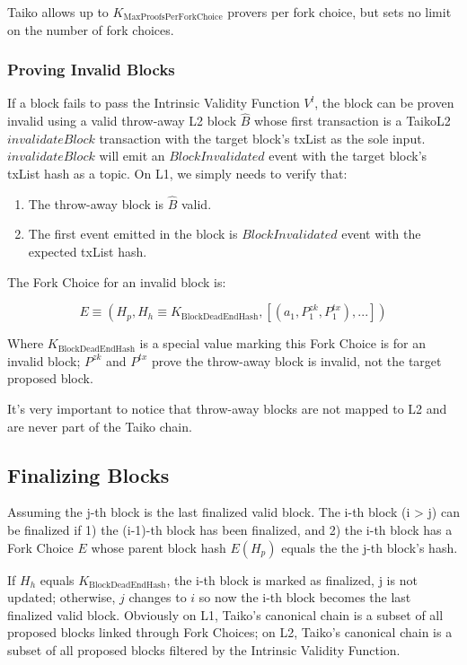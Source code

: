 \documentclass[9pt,oneside]{amsart}
\begin{document}
\begin{multicols}{2}
Taiko allows up to $K_{\mathrm{MaxProofsPerForkChoice}}$ provers per fork choice, but sets no limit on the number of fork choices.

\subsubsection{Proving Invalid Blocks} \label{sec:provinginvaid}

If a block fails to pass the Intrinsic Validity Function $V^l$, the block can be proven invalid using a valid throw-away L2 block $\hat{B}$ whose first transaction is a TaikoL2 $invalidateBlock$ transaction with the target block's txList as the sole input. $invalidateBlock$ will emit an $BlockInvalidated$ event with the target block's txList hash as a topic. On L1, we simply needs to verify that:

\begin{enumerate}
\item The throw-away block is $\hat{B}$ valid.
\item The first event emitted in the block is $BlockInvalidated$ event with the expected txList hash. 
\end{enumerate}

The Fork Choice for an invalid block is:

\begin{equation}
E \equiv (H_p, H_h \equiv K_{\mathrm{BlockDeadEndHash}}, [(a_1, P^{zk}_1, P^{tx}_1),...])
\end{equation}

Where $K_{\mathrm{BlockDeadEndHash}}$ is a special value marking this Fork Choice is for an invalid block; $P^{zk}$ and  $P^{tx}$ prove the throw-away block is invalid, not the target proposed block.

It's very important to notice that throw-away blocks are not mapped to L2 and are never part of the Taiko chain.

\subsection{Finalizing Blocks}\label{sec:finalizing}

Assuming the j-th block is the last finalized valid block. The i-th block (i > j) can be finalized if 1) the (i-1)-th block has been finalized, and 2) the i-th block has a Fork Choice $E$ whose parent block hash $E(H_p)$ equals the the j-th block's hash.

If $H_h$ equals $K_{\mathrm{BlockDeadEndHash}}$, the i-th block is marked as finalized, j is not updated; otherwise,  $j$ changes to $i$ so now the i-th block becomes the last finalized valid block. Obviously on L1, Taiko's canonical chain is a subset of all proposed blocks linked through Fork Choices; on L2, Taiko's canonical chain is a subset of all proposed blocks filtered by the Intrinsic Validity Function.


\end{multicols}
\end{document}
